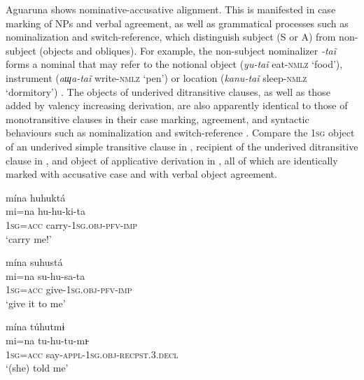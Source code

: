 \documentclass[output=paper]{langscibook}
\begin{document}
Aguaruna shows nominative-accusative alignment. This is manifested in case marking of NPs and verbal agreement, as well as grammatical processes such as nominalization and switch-reference, which distinguish subject (S or A) from non-subject (objects and obliques). For example, the non-subject nominalizer \textit{{}-taĩ} forms a nominal that may refer to the notional object (\textit{yu-taĩ} eat-\textsc{nmlz} ‘food’), instrument (\textit{aɰa-taĩ} write-\textsc{nmlz} ‘pen’) or location (\textit{kanu-taĩ} sleep-\textsc{nmlz} ‘dormitory’) \citep[267]{Overall2017}.
The objects of underived ditransitive clauses, as well as those added by valency increasing derivation, are also apparently identical to those of monotransitive clauses in their case marking, agreement, and syntactic behaviours such as nominalization and switch-reference \citep[269]{Overall2017}. Compare the \textsc{1sg} object of an underived simple transitive clause in , recipient of the underived ditransitive clause in , and object of applicative derivation in , all of which are identically marked with accusative case and with verbal object agreement.

\ea%
    \label{ex:overall:2}
    \glll mína huhuktá\\
 mi=na  hu-hu-ki-ta\\
  \textsc{1sg}=\textsc{acc}  carry-\textsc{1sg.obj-pfv-imp}\\
  \glt  ‘carry me!’ \citep[281]{Overall2017}
\z

\ea%
    \label{ex:overall:3}
    \glll mína suhustá\\
  mi=na  su-hu-sa-ta\\
  \textsc{1sg=acc}  give\textsc{{}-1sg.obj-pfv-imp}\\
  \glt  ‘give it to me’ \citep[243]{Overall2017}
\z

\ea%
    \label{ex:overall:4}
    \glll mína túhutmɨ\\
  mi=na  tu-hu-tu-mı̵\\
  \textsc{1sg}=\textsc{acc}  say-\textsc{appl-1sg.obj-recpst.3.decl}\\
  \glt  ‘(she) told me’ \citep[304]{Overall2017}
\z
\end{document}
